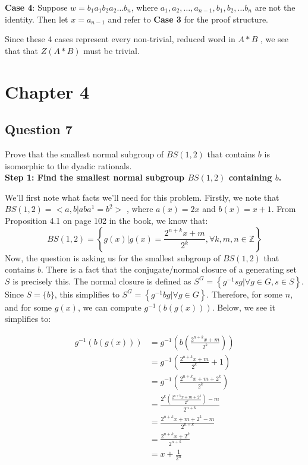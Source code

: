 \documentclass[12pt]{article}%
\newcommand{\Z}{\mathbb{Z}}
\begin{document}
\textbf{Case 4}: Suppose $w=b_{1}a_{1}b_{2}a_{2}\ldots b_{n}$, where $a_1,a_2,\ldots ,a_{n-1}, b_1,b_2,\ldots b_n$ are not the identity. Then let $x=a_{n-1}$ and refer to \textbf{Case 3} for the proof structure. 

Since these 4 cases represent every non-trivial, reduced word in $A*B$ , we see that that $Z(A*B)$ must be trivial.

\section*{Chapter 4}

\subsection*{Question 7}

Prove that the smallest normal subgroup of $BS(1, 2)$ that contains $b$ is isomorphic to the dyadic rationals.\\

\textbf{Step 1: Find the smallest normal subgroup $BS(1,2)$ containing $b$.}

We'll first note what facts we'll need for this problem. Firstly, we note that $BS(1,2)=<a,b|aba^1=b^2>$ , where  $a(x)=2x$ and $b(x)=x+1$.  From Proposition 4.1 on page 102 in the book, we know that: 
\begin{equation}
BS(1,2)=\left\{g(x) | g(x)=\frac{2^{n+k}x+m}{2^k}, \forall k, m, n \in \Z \right\}
\end{equation}
Now, the question is asking us for the smallest subgroup of $BS(1,2)$ that contains $b$. There is a fact that the conjugate/normal closure of a generating set $S$ is precisely this. The normal closure is defined as $S^G=\left\{g^{-1}sg|\forall g\in G, s\in S\right\}$. Since $S=\{b\}$, this simplifies to $S^G=\left\{g^{-1}bg|\forall g\in G\right\}$. Therefore, for some $n$, and for some $g(x)$, we can compute $g^{-1}(b(g(x)))$. Below, we see it simplifies to:

\begin{align*}
g^{-1}(b(g(x)))
&= g^{-1}\left(b\left(\frac{2^{n+k}x+m}{2^k}\right)\right) \\
&= g^{-1}\left(\frac{2^{n+k}x+m}{2^k}+1\right) \\
&= g^{-1}\left(\frac{2^{n+k}x+m+2^k}{2^k}\right) \\
&= \frac{2^k\left(\frac{2^{n+k}x+m+2^k}{2^k}\right)-m}{2^{n+k}} \\
&= \frac{2^{n+k}x+m+2^k-m}{2^{n+k}} \\
&= \frac{2^{n+k}x+2^k}{2^{n+k}} \\
&= x+\frac{1}{2^{n}}
\end{align*}
\end{document}
